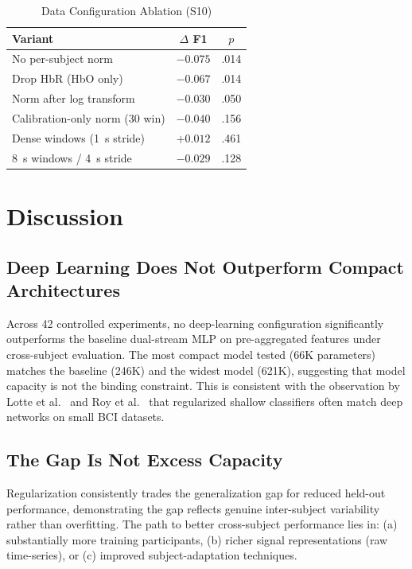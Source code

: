 \documentclass[conference]{IEEEtran}
\begin{document}
\begin{table}[t]
\centering
\caption{Data Configuration Ablation (S10)}
\label{tab:s10}
\begin{tabular}{lcc}
\toprule
\textbf{Variant} & $\Delta$ \textbf{F1} & $p$ \\
\midrule
No per-subject norm & $-0.075$ & .014 \\
Drop HbR (HbO only) & $-0.067$ & .014 \\
Norm after log transform & $-0.030$ & .050 \\
Calibration-only norm (30 win) & $-0.040$ & .156 \\
Dense windows (1~s stride) & $+0.012$ & .461 \\
8~s windows / 4~s stride & $-0.029$ & .128 \\
\bottomrule
\end{tabular}
\end{table}

\section{Discussion}

\subsection{Deep Learning Does Not Outperform Compact Architectures}
Across 42 controlled experiments, no deep-learning configuration significantly outperforms the baseline dual-stream MLP on pre-aggregated features under cross-subject evaluation. The most compact model tested (66K parameters) matches the baseline (246K) and the widest model (621K), suggesting that model capacity is not the binding constraint. This is consistent with the observation by Lotte et al.~\cite{lotte2018review} and Roy et al.~\cite{roy2019deep} that regularized shallow classifiers often match deep networks on small BCI datasets.

\subsection{The Gap Is Not Excess Capacity}
Regularization consistently trades the generalization gap for reduced held-out performance, demonstrating the gap reflects genuine inter-subject variability rather than overfitting. The path to better cross-subject performance lies in: (a) substantially more training participants, (b) richer signal representations (raw time-series), or (c) improved subject-adaptation techniques.
\end{document}
